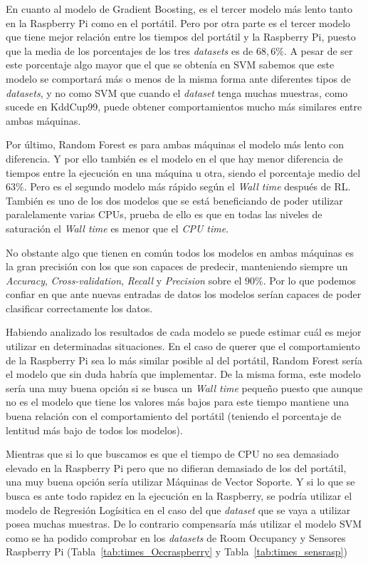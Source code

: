 \documentclass[a4paper, 12pt]{book}
\begin{document}
En cuanto al modelo de Gradient Boosting, es el tercer modelo más lento tanto en la Raspberry Pi como en el portátil. Pero por otra parte es el tercer modelo que tiene mejor relación entre los tiempos del portátil y la Raspberry Pi, puesto que la media de los porcentajes de los tres \textit{datasets} es de $68,6\%$. A pesar de ser este porcentaje algo mayor que el que se obtenía en SVM sabemos que este modelo se comportará más o menos de la misma forma ante diferentes tipos de \textit{datasets}, y no como SVM que cuando el \textit{dataset} tenga muchas muestras, como sucede en KddCup99, puede obtener comportamientos mucho más similares entre ambas máquinas.

Por último, Random Forest es para ambas máquinas el modelo más lento con diferencia. Y por ello también es el modelo en el que hay menor diferencia de tiempos entre la ejecución en una máquina u otra, siendo el porcentaje medio del $63\%$. Pero es el segundo modelo más rápido según el \textit{Wall time} después de RL. También es uno de los dos modelos que se está beneficiando de poder utilizar paralelamente varias CPUs, prueba de ello es que en todas las niveles de saturación el \textit{Wall time} es menor que el \textit{CPU time}.

No obstante algo que tienen en común todos los modelos en ambas máquinas es la gran precisión con los que son capaces de predecir, manteniendo siempre un \textit{Accuracy}, \textit{Cross-validation}, \textit{Recall} y \textit{Precision} sobre el $90\%$. Por lo que podemos confiar en que ante nuevas entradas de datos los modelos serían capaces de poder clasificar correctamente los datos.

Habiendo analizado los resultados de cada modelo se puede estimar cuál es mejor utilizar en determinadas situaciones. En el caso de querer que el comportamiento de la Raspberry Pi sea lo más similar posible al del portátil, Random Forest sería el modelo que sin duda habría que implementar. De la misma forma, este modelo sería una muy buena opción si se busca un \textit{Wall time} pequeño puesto que aunque no es el modelo que tiene los valores más bajos para este tiempo mantiene una buena relación con el comportamiento del portátil (teniendo el porcentaje de lentitud más bajo de todos los modelos).

Mientras que si lo que buscamos es que el tiempo de CPU no sea demasiado elevado en la Raspberry Pi pero que no difieran demasiado de los del portátil, una muy buena opción sería utilizar Máquinas de Vector Soporte.
Y si lo que se busca es ante todo rapidez en la ejecución en la Raspberry, se podría utilizar el modelo de Regresión Logísitica en el caso del que \textit{dataset} que se vaya a utilizar posea muchas muestras. De lo contrario compensaría más utilizar el modelo SVM como se ha podido comprobar en los \textit{datasets} de Room Occupancy y Sensores Raspberry Pi (Tabla~\ref{tab:times_Occraspberry} y Tabla~\ref{tab:times_sensrasp})
 
\end{document}
